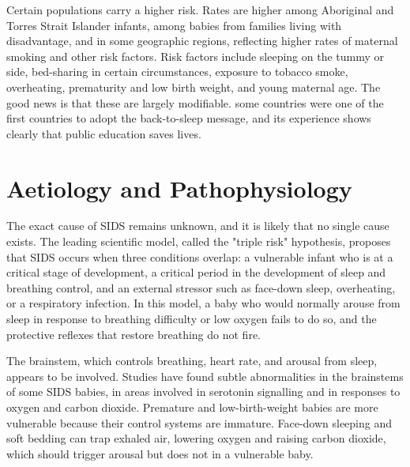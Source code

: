 Certain populations carry a higher risk. Rates are higher among Aboriginal and Torres Strait Islander infants, among babies from families living with disadvantage, and in some geographic regions, reflecting higher rates of maternal smoking and other risk factors. Risk factors include sleeping on the tummy or side, bed-sharing in certain circumstances, exposure to tobacco smoke, overheating, prematurity and low birth weight, and young maternal age. The good news is that these are largely modifiable. some countries were one of the first countries to adopt the back-to-sleep message, and its experience shows clearly that public education saves lives.

\section*{Aetiology and Pathophysiology}
The exact cause of SIDS remains unknown, and it is likely that no single cause exists. The leading scientific model, called the "triple risk" hypothesis, proposes that SIDS occurs when three conditions overlap: a vulnerable infant who is at a critical stage of development, a critical period in the development of sleep and breathing control, and an external stressor such as face-down sleep, overheating, or a respiratory infection. In this model, a baby who would normally arouse from sleep in response to breathing difficulty or low oxygen fails to do so, and the protective reflexes that restore breathing do not fire.

The brainstem, which controls breathing, heart rate, and arousal from sleep, appears to be involved. Studies have found subtle abnormalities in the brainstems of some SIDS babies, in areas involved in serotonin signalling and in responses to oxygen and carbon dioxide. Premature and low-birth-weight babies are more vulnerable because their control systems are immature. Face-down sleeping and soft bedding can trap exhaled air, lowering oxygen and raising carbon dioxide, which should trigger arousal but does not in a vulnerable baby.

